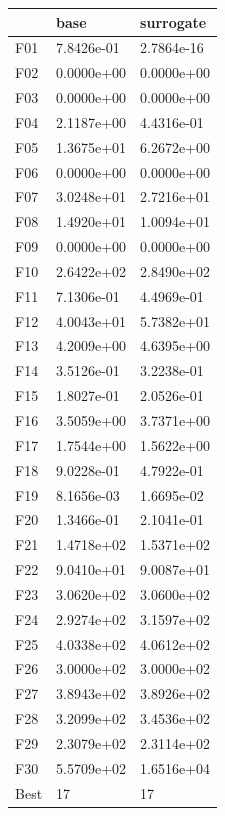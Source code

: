 \begin{tabular}{lll}
\toprule
{} &        base &   surrogate \\
\midrule
F01  &  7.8426e-01 &  2.7864e-16 \\
F02  &  0.0000e+00 &  0.0000e+00 \\
F03  &  0.0000e+00 &  0.0000e+00 \\
F04  &  2.1187e+00 &  4.4316e-01 \\
F05  &  1.3675e+01 &  6.2672e+00 \\
F06  &  0.0000e+00 &  0.0000e+00 \\
F07  &  3.0248e+01 &  2.7216e+01 \\
F08  &  1.4920e+01 &  1.0094e+01 \\
F09  &  0.0000e+00 &  0.0000e+00 \\
F10  &  2.6422e+02 &  2.8490e+02 \\
F11  &  7.1306e-01 &  4.4969e-01 \\
F12  &  4.0043e+01 &  5.7382e+01 \\
F13  &  4.2009e+00 &  4.6395e+00 \\
F14  &  3.5126e-01 &  3.2238e-01 \\
F15  &  1.8027e-01 &  2.0526e-01 \\
F16  &  3.5059e+00 &  3.7371e+00 \\
F17  &  1.7544e+00 &  1.5622e+00 \\
F18  &  9.0228e-01 &  4.7922e-01 \\
F19  &  8.1656e-03 &  1.6695e-02 \\
F20  &  1.3466e-01 &  2.1041e-01 \\
F21  &  1.4718e+02 &  1.5371e+02 \\
F22  &  9.0410e+01 &  9.0087e+01 \\
F23  &  3.0620e+02 &  3.0600e+02 \\
F24  &  2.9274e+02 &  3.1597e+02 \\
F25  &  4.0338e+02 &  4.0612e+02 \\
F26  &  3.0000e+02 &  3.0000e+02 \\
F27  &  3.8943e+02 &  3.8926e+02 \\
F28  &  3.2099e+02 &  3.4536e+02 \\
F29  &  2.3079e+02 &  2.3114e+02 \\
F30  &  5.5709e+02 &  1.6516e+04 \\
Best &          17 &          17 \\
\bottomrule
\end{tabular}
